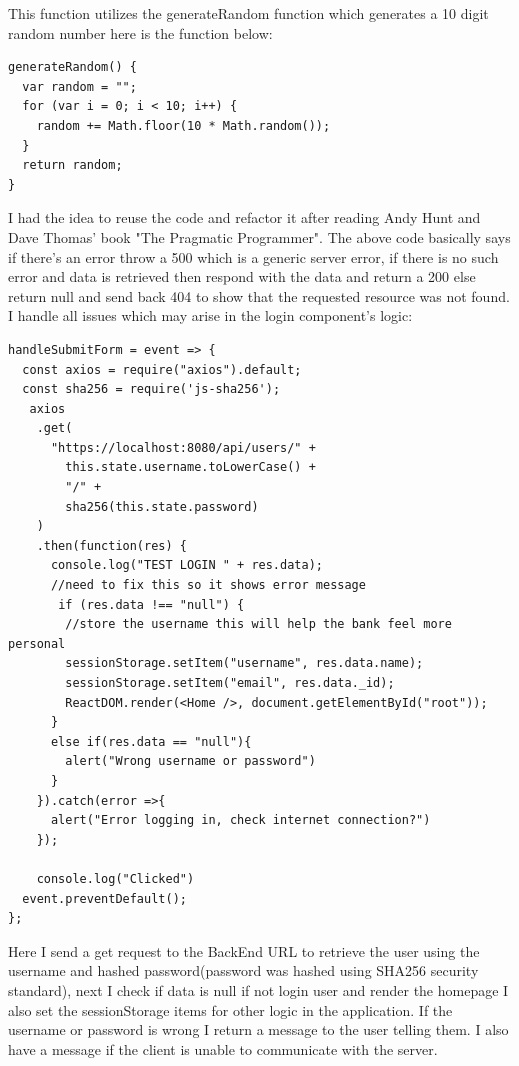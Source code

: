 This function utilizes the generateRandom function which generates a 10 digit random number here is the function below:
\begin{verbatim}
generateRandom() {
  var random = "";
  for (var i = 0; i < 10; i++) {
    random += Math.floor(10 * Math.random());
  }
  return random;
}
\end{verbatim}
I had the idea to reuse the code and refactor it after reading Andy Hunt and Dave Thomas' book "The Pragmatic Programmer"\cite{PragmaticProgrammer}.  The above code basically says if there's an error throw a 500 which is a generic server error, if there is no such error and data is retrieved then respond with the data and return a 200 else return null and send back 404 to show that the requested resource was not found.  I handle all issues which may arise in the login component's logic:
\begin{verbatim}
handleSubmitForm = event => {
  const axios = require("axios").default;
  const sha256 = require('js-sha256');
   axios
    .get(
      "https://localhost:8080/api/users/" +
        this.state.username.toLowerCase() +
        "/" +
        sha256(this.state.password)
    )
    .then(function(res) {
      console.log("TEST LOGIN " + res.data);
      //need to fix this so it shows error message
       if (res.data !== "null") {
        //store the username this will help the bank feel more personal
        sessionStorage.setItem("username", res.data.name);
        sessionStorage.setItem("email", res.data._id);
        ReactDOM.render(<Home />, document.getElementById("root"));
      }
      else if(res.data == "null"){
        alert("Wrong username or password")
      }
    }).catch(error =>{
      alert("Error logging in, check internet connection?")
    });

    console.log("Clicked")
  event.preventDefault();
};
\end{verbatim}
Here I send a get request to the BackEnd URL to retrieve the user using the username and
hashed password(password was hashed using SHA256 security standard), next I check if data is null
if not login user and render the homepage I also set the sessionStorage items for other logic in the application.
If the username or password is wrong I return a message to the user telling them.  I also have a message if the
client is unable to communicate with the server.
\\
\\
